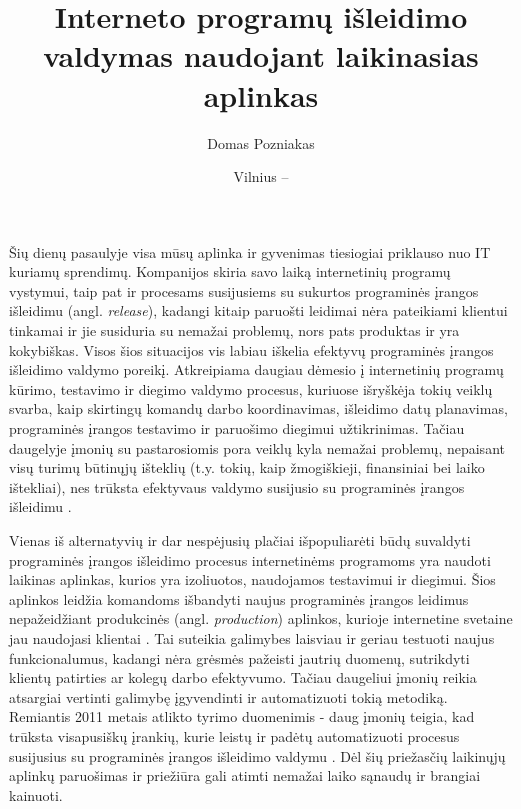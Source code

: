\documentclass{VUMIFPSkursinis}
\institute{Informatikos institutas}  %
\title{Interneto programų išleidimo valdymas naudojant laikinasias aplinkas}
\author{Domas Pozniakas}
\date{Vilnius – \the\year}
\begin{document}
\maketitle

\tableofcontents


Šių dienų pasaulyje visa mūsų aplinka ir gyvenimas tiesiogiai priklauso nuo IT kuriamų sprendimų. Kompanijos skiria savo laiką internetinių programų vystymui, taip pat ir procesams susijusiems su sukurtos programinės įrangos išleidimu (angl. \textit{release}), kadangi kitaip paruošti leidimai nėra pateikiami klientui tinkamai ir jie susiduria su nemažai problemų, nors pats produktas ir yra kokybiškas. Visos šios situacijos vis labiau iškelia efektyvų programinės įrangos išleidimo valdymo poreikį. Atkreipiama daugiau dėmesio į internetinių programų kūrimo, testavimo ir diegimo valdymo procesus, kuriuose išryškėja tokių veiklų svarba, kaip skirtingų komandų darbo koordinavimas, išleidimo datų planavimas, programinės įrangos testavimo ir paruošimo diegimui užtikrinimas. Tačiau daugelyje įmonių su pastarosiomis pora veiklų kyla nemažai problemų, nepaisant visų turimų būtinųjų išteklių (t.y. tokių, kaip žmogiškieji, finansiniai bei laiko ištekliai), nes trūksta efektyvaus valdymo susijusio su programinės įrangos išleidimu \cite{SaltPirmas}. 


Vienas iš alternatyvių ir dar nespėjusių plačiai išpopuliarėti būdų suvaldyti programinės įrangos išleidimo procesus internetinėms programoms yra naudoti laikinas aplinkas, kurios yra izoliuotos, naudojamos testavimui ir diegimui. Šios aplinkos leidžia komandoms išbandyti naujus programinės įrangos leidimus nepažeidžiant produkcinės (angl. \textit{production}) aplinkos, kurioje internetine svetaine jau naudojasi klientai \cite{SaltAntras}. Tai suteikia galimybes laisviau ir geriau testuoti naujus funkcionalumus, kadangi nėra grėsmės pažeisti jautrių duomenų, sutrikdyti klientų patirties ar kolegų darbo efektyvumo. Tačiau daugeliui įmonių reikia atsargiai vertinti galimybę įgyvendinti ir automatizuoti tokią metodiką. Remiantis 2011 metais atlikto tyrimo duomenimis - daug įmonių teigia, kad trūksta visapusiškų įrankių, kurie leistų ir padėtų automatizuoti procesus susijusius su programinės įrangos išleidimo valdymu \cite{SaltPirmas}. Dėl šių priežasčių laikinųjų aplinkų paruošimas ir priežiūra gali atimti nemažai laiko sąnaudų ir brangiai kainuoti.
\end{document}
